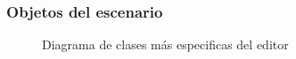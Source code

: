 \documentclass[a4paper]{article}
\begin{document}
\newpage
\subsubsection{Objetos del escenario}

\begin{figure}[!h]
\caption{Diagrama de clases más especificas del editor}
\label{fig:diagrama7}
\end{figure}
\end{document}
